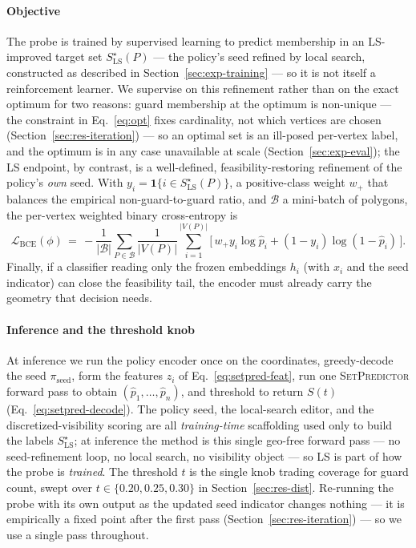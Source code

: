 \documentclass[preprint,10pt]{elsarticle}
\newcommand{\SetPredictor}{\textup{\textsc{SetPredictor}}}
\begin{document}
\paragraph{Objective} The probe is trained by supervised learning to predict membership in an LS-improved target set $S^\star_{\mathrm{LS}}(P)$ --- the policy's seed refined by local search, constructed as described in Section~\ref{sec:exp-training} --- so it is not itself a reinforcement learner. We supervise on this refinement rather than on the exact optimum for two reasons: guard membership at the optimum is non-unique --- the constraint in Eq.~\eqref{eq:opt} fixes cardinality, not which vertices are chosen (Section~\ref{sec:res-iteration}) --- so an optimal set is an ill-posed per-vertex label, and the optimum is in any case unavailable at scale (Section~\ref{sec:exp-eval}); the LS endpoint, by contrast, is a well-defined, feasibility-restoring refinement of the policy's \emph{own} seed. With $y_i = \mathbf{1}\{i \in S^\star_{\mathrm{LS}}(P)\}$, a positive-class weight $w_{+}$ that balances the empirical non-guard-to-guard ratio, and $\mathcal{B}$ a mini-batch of polygons, the per-vertex weighted binary cross-entropy is
\begin{equation}
\mathcal{L}_{\mathrm{BCE}}(\phi) \,=\, -\frac{1}{|\mathcal{B}|} \sum_{P \in \mathcal{B}} \frac{1}{|V(P)|} \sum_{i=1}^{|V(P)|} \big[\, w_{+} y_i \log \hat{p}_i + (1 - y_i) \log(1 - \hat{p}_i) \,\big].
\label{eq:setpred-loss}
\end{equation}
Finally,  if a classifier reading only the frozen embeddings $h_i$ (with $x_i$ and the seed indicator) can close the feasibility tail, the encoder must already carry the geometry that decision needs.

\paragraph{Inference and the threshold knob} At inference we run the policy encoder once on the coordinates, greedy-decode the seed $\pi_{\mathrm{seed}}$, form the features $z_i$ of Eq.~\eqref{eq:setpred-feat}, run one \SetPredictor{} forward pass to obtain $(\hat{p}_1, \dots, \hat{p}_n)$, and threshold to return $S(t)$ (Eq.~\eqref{eq:setpred-decode}). The policy seed, the local-search editor, and the discretized-visibility scoring are all \emph{training-time} scaffolding used only to build the labels $S^\star_{\mathrm{LS}}$; at inference the method is this single geo-free forward pass --- no seed-refinement loop, no local search, no visibility object --- so LS is part of how the probe is \emph{trained}. The threshold $t$ is the single knob trading coverage for guard count, swept over $t \in \{0.20, 0.25, 0.30\}$ in Section~\ref{sec:res-dist}. Re-running the probe with its own output as the updated seed indicator changes nothing --- it is empirically a fixed point after the first pass (Section~\ref{sec:res-iteration}) --- so we use a single pass throughout.
\end{document}
